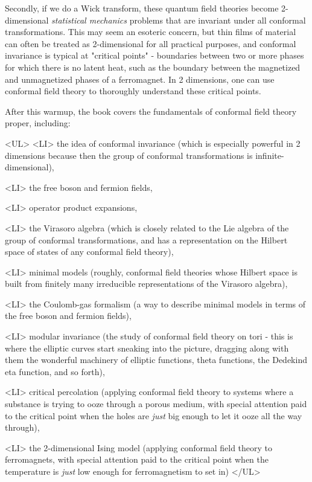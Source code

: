 Secondly, if we do a Wick transform, these quantum field theories become
2-dimensional \emph{statistical mechanics} problems that are invariant under
all conformal transformations.  This may seem an esoteric concern, but
thin films of material can often be treated as 2-dimensional for all
practical purposes, and conformal invariance is typical at "critical
points" - boundaries between two or more phases for which there is no
latent heat, such as the boundary between the magnetized and
unmagnetized phases of a ferromagnet.  In 2 dimensions, one can use
conformal field theory to thoroughly understand these critical points.  

After this warmup, the book covers the fundamentals of conformal field
theory proper, including:

<UL>
<LI> the idea of conformal invariance (which is especially powerful in 2
dimensions because then the group of conformal transformations is
infinite-dimensional),

<LI> the free boson and fermion fields,

<LI> operator product expansions, 

<LI> the Virasoro algebra (which is closely related to the Lie algebra of
the group of conformal transformations, and has a representation on the
Hilbert space of states of any conformal field theory), 

<LI> minimal models (roughly, conformal field theories whose Hilbert space 
is built from finitely many irreducible representations of the Virasoro 
algebra),

<LI> the Coulomb-gas formalism (a way to describe minimal models in terms
of the free boson and fermion fields),

<LI> modular invariance (the study of conformal field theory on tori - 
this is where the elliptic curves start sneaking into the picture, 
dragging along with them the wonderful machinery of elliptic functions,
theta functions, the Dedekind eta function, and so forth),

<LI> critical percolation (applying conformal field theory to systems
where a substance is trying to ooze through a porous medium, with
special attention paid to the critical point when the holes are \emph{just}
big enough to let it ooze all the way through),

<LI> the 2-dimensional Ising model (applying conformal field theory to
ferromagnets, with special attention paid to the critical point when
the temperature is \emph{just} low enough for ferromagnetism to set in)
</UL>

